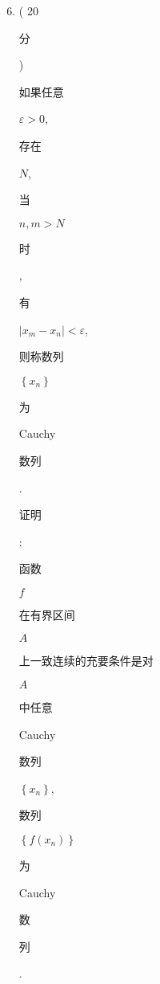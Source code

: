 \documentclass[10pt]{article}
\begin{document}
\begin{enumerate}
  \setcounter{enumi}{5}
  \item ( 20 \begin{CJK}{UTF8}{mj}分\end{CJK}) \begin{CJK}{UTF8}{mj}如果任意\end{CJK} $\varepsilon>0$, \begin{CJK}{UTF8}{mj}存在\end{CJK} $N$, \begin{CJK}{UTF8}{mj}当\end{CJK} $n, m>N$ \begin{CJK}{UTF8}{mj}时\end{CJK}, \begin{CJK}{UTF8}{mj}有\end{CJK} $\left|x_{m}-x_{n}\right|<\varepsilon$, \begin{CJK}{UTF8}{mj}则称数列\end{CJK} $\left\{x_{n}\right\}$ \begin{CJK}{UTF8}{mj}为\end{CJK} Cauchy \begin{CJK}{UTF8}{mj}数列\end{CJK}. \begin{CJK}{UTF8}{mj}证明\end{CJK}: \begin{CJK}{UTF8}{mj}函数\end{CJK} $f$ \begin{CJK}{UTF8}{mj}在有界区间\end{CJK} $A$ \begin{CJK}{UTF8}{mj}上一致连续的充要条件是对\end{CJK} $A$ \begin{CJK}{UTF8}{mj}中任意\end{CJK} Cauchy \begin{CJK}{UTF8}{mj}数列\end{CJK} $\left\{x_{n}\right\}$, \begin{CJK}{UTF8}{mj}数列\end{CJK} $\left\{f\left(x_{n}\right)\right\}$ \begin{CJK}{UTF8}{mj}为\end{CJK} Cauchy \begin{CJK}{UTF8}{mj}数\end{CJK} \begin{CJK}{UTF8}{mj}列\end{CJK}.


\end{enumerate}
\end{document}
